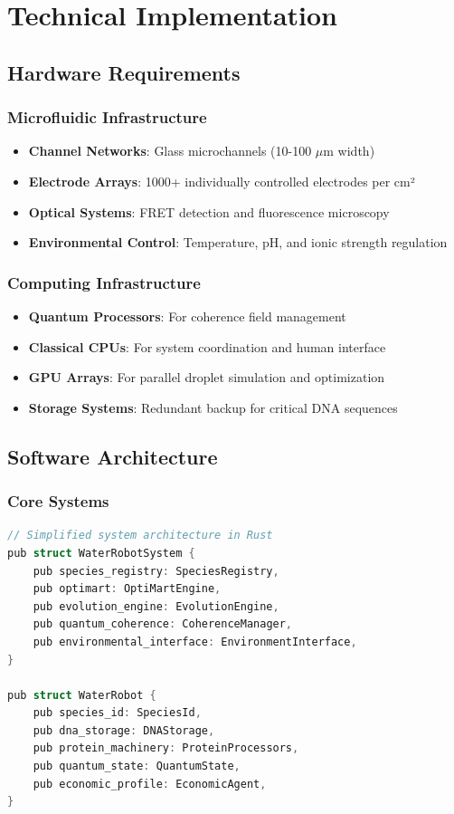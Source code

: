 \documentclass[11pt,a4paper]{article}
\begin{document}
\section{Technical Implementation}

\subsection{Hardware Requirements}

\subsubsection{Microfluidic Infrastructure}
\begin{itemize}
    \item \textbf{Channel Networks}: Glass microchannels (10-100 $\mu$m width)
    \item \textbf{Electrode Arrays}: 1000+ individually controlled electrodes per cm²
    \item \textbf{Optical Systems}: FRET detection and fluorescence microscopy
    \item \textbf{Environmental Control}: Temperature, pH, and ionic strength regulation
\end{itemize}

\subsubsection{Computing Infrastructure}
\begin{itemize}
    \item \textbf{Quantum Processors}: For coherence field management
    \item \textbf{Classical CPUs}: For system coordination and human interface
    \item \textbf{GPU Arrays}: For parallel droplet simulation and optimization
    \item \textbf{Storage Systems}: Redundant backup for critical DNA sequences
\end{itemize}

\subsection{Software Architecture}

\subsubsection{Core Systems}
\begin{lstlisting}[language=C, caption=Core System Architecture]
// Simplified system architecture in Rust
pub struct WaterRobotSystem {
    pub species_registry: SpeciesRegistry,
    pub optimart: OptiMartEngine,
    pub evolution_engine: EvolutionEngine,
    pub quantum_coherence: CoherenceManager,
    pub environmental_interface: EnvironmentInterface,
}

pub struct WaterRobot {
    pub species_id: SpeciesId,
    pub dna_storage: DNAStorage,
    pub protein_machinery: ProteinProcessors,
    pub quantum_state: QuantumState,
    pub economic_profile: EconomicAgent,
}
\end{lstlisting}
\end{document}
